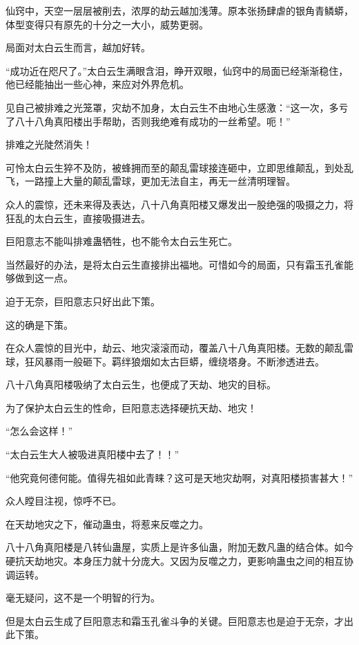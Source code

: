 
\begin{this_body}

仙窍中，天空一层层被削去，浓厚的劫云越加浅薄。原本张扬肆虐的银角青鳞蟒，体型变得只有原先的十分之一大小，威势更弱。

局面对太白云生而言，越加好转。

“成功近在咫尺了。”太白云生满眼含泪，睁开双眼，仙窍中的局面已经渐渐稳住，他已经能抽出一些心神，来应对外界危机。

见自己被排难之光笼罩，灾劫不加身，太白云生不由地心生感激：“这一次，多亏了八十八角真阳楼出手帮助，否则我绝难有成功的一丝希望。呃！”

排难之光陡然消失！

可怜太白云生猝不及防，被蜂拥而至的颠乱雷球接连砸中，立即思维颠乱，到处乱飞，一路撞上大量的颠乱雷球，更加无法自主，再无一丝清明理智。

众人的震惊，还未来得及表达，八十八角真阳楼又爆发出一股绝强的吸摄之力，将狂乱的太白云生，直接吸摄进去。

巨阳意志不能叫排难蛊牺牲，也不能令太白云生死亡。

当然最好的办法，是将太白云生直接排出福地。可惜如今的局面，只有霜玉孔雀能够做到这一点。

迫于无奈，巨阳意志只好出此下策。

这的确是下策。

在众人震惊的目光中，劫云、地灾滚滚而动，覆盖八十八角真阳楼。无数的颠乱雷球，狂风暴雨一般砸下。羁绊狼烟如太古巨蟒，缠绕塔身。不断渗透进去。

八十八角真阳楼吸纳了太白云生，也便成了天劫、地灾的目标。

为了保护太白云生的性命，巨阳意志选择硬抗天劫、地灾！

“怎么会这样！”

“太白云生大人被吸进真阳楼中去了！！”

“他究竟何德何能。值得先祖如此青睐？这可是天地灾劫啊，对真阳楼损害甚大！”

众人瞠目注视，惊呼不已。

在天劫地灾之下，催动蛊虫，将惹来反噬之力。

八十八角真阳楼是八转仙蛊屋，实质上是许多仙蛊，附加无数凡蛊的结合体。如今硬抗天劫地灾。本身压力就十分庞大。又因为反噬之力，更影响蛊虫之间的相互协调运转。

毫无疑问，这不是一个明智的行为。

但是太白云生成了巨阳意志和霜玉孔雀斗争的关键。巨阳意志也是迫于无奈，才出此下策。


\end{this_body}
